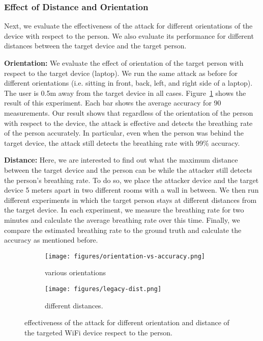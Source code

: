 \subsubsection{Effect of Distance and Orientation}
Next, we evaluate the effectiveness of the attack for different orientations of the device with respect to the person. We also evaluate its performance for different distances between the target device and the target person.

\vspace{0.05in}
\noindent\textbf{Orientation:}
We evaluate the effect of orientation of the target person with respect to the target device (laptop). We run the same attack as before for different orientations (i.e. sitting in front, back, left, and right side of a laptop). The user is 0.5m away from the target device in all cases. Figure~\ref{fig:orientation_vs_accuracy} shows the result of this experiment. Each bar shows the average accuracy for 90 measurements. Our result shows that regardless of the orientation of the person with respect to the device, the attack is effective and detects the breathing rate of the person accurately. In particular, even when the person was behind the target device, the attack still detects the breathing rate with 99\% accuracy.

\vspace{0.05in}
\noindent
\textbf{Distance:}
Here,  we are interested to find out what the maximum distance between the target device and the person can be while the attacker still detects the person's breathing rate. To do so, we place the attacker device and the target device 5 meters apart in two different rooms with a wall in between. We then run different experiments in which the target person stays at different distances from the target device. In each experiment, we measure the breathing rate for two minutes and calculate the average breathing rate over this time. Finally, we compare the estimated breathing rate to the ground truth and calculate the accuracy as mentioned before. 



\begin{figure}[t]
    \centering
    \begin{subfigure}[b]{0.32\textwidth}
        \centering 
        \texttt{[image: figures/orientation-vs-accuracy.png]}
         \caption{various orientations}
        \label{fig:orientation_vs_accuracy}
    \end{subfigure}
    \hfill
    \begin{subfigure}[b]{0.32\textwidth}
        \centering
        \texttt{[image: figures/legacy-dist.png]}
        \caption{different distances.}
        \label{fig:dist_vs_accuracy}
    \end{subfigure}
    \caption{effectiveness of the attack for different orientation and distance of the targeted WiFi device respect to the person.}
\end{figure}

